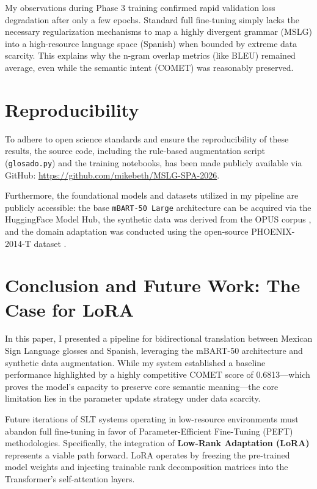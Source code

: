 \documentclass[11pt,a4paper,english]{ceurart}
\begin{document}
My observations during Phase 3 training confirmed rapid validation loss degradation after only a few epochs. Standard full fine-tuning simply lacks the necessary regularization mechanisms to map a highly divergent grammar (MSLG) into a high-resource language space (Spanish) when bounded by extreme data scarcity. This explains why the n-gram overlap metrics (like BLEU) remained average, even while the semantic intent (COMET) was reasonably preserved.

\section{Reproducibility}
To adhere to open science standards and ensure the reproducibility of these results, the source code, including the rule-based augmentation script (\texttt{glosado.py}) and the training notebooks, has been made publicly available via GitHub: \url{https://github.com/mikebeth/MSLG-SPA-2026}. 

Furthermore, the foundational models and datasets utilized in my pipeline are publicly accessible: the base \texttt{mBART-50 Large} architecture can be acquired via the HuggingFace Model Hub, the synthetic data was derived from the OPUS corpus \cite{tiedemann2012parallel}, and the domain adaptation was conducted using the open-source PHOENIX-2014-T dataset \cite{camgoz2018neural}.

\section{Conclusion and Future Work: The Case for LoRA}

In this paper, I presented a pipeline for bidirectional translation between Mexican Sign Language glosses and Spanish, leveraging the mBART-50 architecture and synthetic data augmentation. While my system established a baseline performance highlighted by a highly competitive COMET score of 0.6813---which proves the model's capacity to preserve core semantic meaning---the core limitation lies in the parameter update strategy under data scarcity.

Future iterations of SLT systems operating in low-resource environments must abandon full fine-tuning in favor of Parameter-Efficient Fine-Tuning (PEFT) methodologies. Specifically, the integration of \textbf{Low-Rank Adaptation (LoRA)} \cite{hu2021lora} represents a viable path forward. LoRA operates by freezing the pre-trained model weights and injecting trainable rank decomposition matrices into the Transformer's self-attention layers. 
\end{document}
